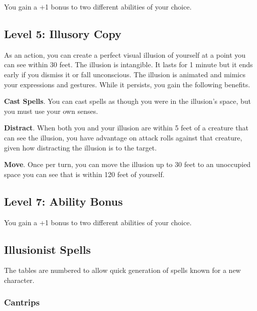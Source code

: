 \documentclass[12pt,letterpaper,twocolumn,openany,nodeprecatedcode,bg=none]{dndbook}
\let\oldsubsection\subsection
\renewcommand{\subsection}[1]{%
  \needspace{5\baselineskip}%
  \oldsubsection{#1}%
}
\begin{document}
You gain a +1 bonus to two different abilities of your choice.

\subsection{Level 5: Illusory Copy}\label{level-5-illusory-copy}

As an action, you can create a perfect visual illusion of yourself at a
point you can see within 30 feet. The illusion is intangible. It lasts
for 1 minute but it ends early if you dismiss it or fall unconscious.
The illusion is animated and mimics your expressions and gestures. While
it persists, you gain the following benefits.

\textbf{Cast Spells}. You can cast spells as though you were in the
illusion's space, but you must use your own senses.

\textbf{Distract}. When both you and your illusion are within 5 feet of
a creature that can see the illusion, you have advantage on attack rolls
against that creature, given how distracting the illusion is to the
target.

\textbf{Move}. Once per turn, you can move the illusion up to 30 feet to
an unoccupied space you can see that is within 120 feet of yourself.

\subsection{Level 7: Ability Bonus}\label{level-7-ability-bonus}

You gain a +1 bonus to two different abilities of your choice.

\subsection{Illusionist Spells}\label{illusionist-spells}

The tables are numbered to allow quick generation of spells known for a
new character.

\subsubsection{Cantrips}\label{cantrips}

\end{document}

